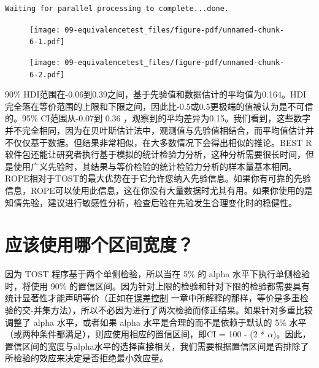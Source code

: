 \documentclass[
  letterpaper,
  DIV=11,
  numbers=noendperiod]{scrreprt}
\begin{document}
\begin{verbatim}
Waiting for parallel processing to complete...done.
\end{verbatim}

\begin{figure}

{\centering \texttt{[image: 09-equivalencetest\_files/figure-pdf/unnamed-chunk-6-1.pdf]}

}

\end{figure}

\begin{figure}

{\centering \texttt{[image: 09-equivalencetest\_files/figure-pdf/unnamed-chunk-6-2.pdf]}

}

\end{figure}

90\%
HDI范围在-0.06到0.39之间，基于先验值和数据估计的平均值为0.164。HDI完全落在等价范围的上限和下限之间，因此比-0.5或0.5更极端的值被认为是不可信的。95\%
CI范围从-0.07到 0.36
，观察到的平均差异为0.15。我们看到，这些数字并不完全相同，因为在贝叶斯估计法中，观测值与先验值相结合，而平均值估计并不仅仅基于数据。但结果非常相似，在大多数情况下会得出相似的推论。BEST
R软件包还能让研究者执行基于模拟的统计检验力分析，这种分析需要很长时间，但是使用广义先验时，其结果与等价检验的统计检验力分析的样本量基本相同。ROPE相对于TOST的最大优势在于它允许您纳入先验信息。如果你有可靠的先验信息，ROPE可以使用此信息，这在你没有大量数据时尤其有用。如果你使用的是知情先验，建议进行敏感性分析，检查后验在先验发生合理变化时的稳健性。

\hypertarget{sec-whichinterval}{%
\section{应该使用哪个区间宽度？}\label{sec-whichinterval}}

因为 TOST 程序基于两个单侧检验，所以当在 5\% 的 alpha
水平下执行单侧检验时，将使用 90\%
的置信区间。因为针对上限的检验和针对下限的检验都需要具有统计显著性才能声明等价（正如在\protect\hyperlink{multiplecomparisons}{误差控制}
一章中所解释的那样，等价是多重检验的交-并集方法），所以不必因为进行了两次检验而修正结果。如果针对多重比较调整了
alpha 水平，或者如果 alpha 水平是合理的而不是依赖于默认的 5\%
水平（或两种条件都满足），则应使用相应的置信区间，即CI = 100 - (2 *
\(\alpha\))。因此，置信区间的宽度与alpha水平的选择直接相关，我们需要根据置信区间是否排除了所检验的效应来决定是否拒绝最小效应量。
\end{document}
